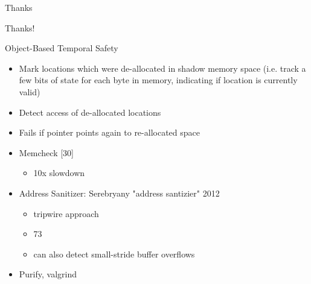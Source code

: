 \documentclass[aspectratio=169]{beamer}
\begin{document}
\begin{frame}{Thanks}
    \begin{center}
        \Huge{Thanks!}
    \end{center}
\end{frame}


\begin{frame}{Object-Based Temporal Safety}
\begin{itemize}
\item Mark locations which were de-allocated in shadow memory space (i.e. track a few bits of state for each byte in memory, indicating if location is currently valid)
\item Detect access of de-allocated locations
\item Fails if pointer points again to re-allocated space
\item Memcheck [30] 
    \begin{itemize}
      \item 10x slowdown
    \end{itemize}
\item Address Sanitizer: Serebryany "address santizier" 2012
    \begin{itemize}
        \item tripwire approach
        \item 73%
        \item can also detect small-stride buffer overflows
    \end{itemize}
\item Purify, valgrind
\end{itemize}
\end{frame}
\end{document}
